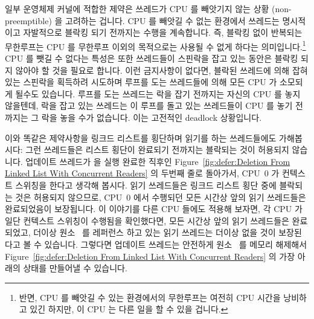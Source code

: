일부 운영체제 커널에 적합한 제약은 쓰레드가 CPU 를 빼앗기지 않는 상황
(non-preemptible) 을 고려하는 겁니다.
CPU 를 빼앗길 수 없는 환경에서 쓰레드는 명시적이고 자발적으로 블락킹 되기
전까지는 수행을 계속합니다.
즉, 블락킹 없이 반복되는 무한루프는 CPU 를 무한루프 이외의 목적으로는 사용될 수
없게 하다는 의미입니다.\footnote{
	반면, CPU 를 빼앗길 수 있는 환경에서의 무한루프는 여전히 CPU 시간을
	낭비하고 있긴 하지만, 이 CPU 는 다른 일을 할 수 있을 겁니다.}
CPU 를 뺏길 수 없다는 특성은 또한 쓰레드들이 스핀락을 잡고 있는 동안은 블락킹
되지 않아야 할 것을 필요로 합니다.
이런 금지사항이 없다면, 블락된 쓰레드에 의해 잡혀 있는 스핀락을 획득하려
시도하며 루프를 도는 쓰레드들에 의해 모든 CPU 가 소모되게 될수도 있습니다.
루프를 도는 쓰레드는 락을 잡기 전까지는 자신의 CPU 를 놓지 않을텐데, 락을 잡고
있는 쓰레드는 이 루프를 돌고 있는 쓰레드들이 CPU 를 놓기 전까지는 그 락을 놓을
수가 없습니다.
이는 고전적인 deadlock 상황입니다.

이와 똑같은 제약사항을 링크드 리스트를 횡단하며 읽기를 하는 쓰레드들에도
가해봅시다: 그런 쓰레드들은 리스트 횡단이 완료되기 전까지는 블락되는 것이
허용되지 않습니다.
업데이트 쓰레드가  을 실행 완료한 직후인
Figure~\ref{fig:defer:Deletion From Linked List With Concurrent Readers} 의
두번째 줄로 돌아가서, CPU~0 가 컨텍스트 스위칭을 한다고 생각해 봅시다.
읽기 쓰레드들은 링크드 리스트 횡단 중에 블락되는 것은 허용되지 않으므로, CPU~0
에서 수행되던 모든 시간상 앞의 읽기 쓰레드들은 완료되었음이 보장됩니다.
이 이야기를 다른 CPU 들에도 적용해 보자면, 각 CPU 가 일단 컨텍스트 스위칭이
수행됨을 확인했다면, 모든 시간상 앞의 읽기 쓰레드들은 완료되었고, 더이상
원소~ 를 레퍼런스 하고 있는 읽기 쓰레드는 더이상 없을 것이 보장된다고 볼
수 있습니다.
그렇다면 업데이트 쓰레드는 안전하게 원소~ 를 메모리 해제해서
Figure~\ref{fig:defer:Deletion From Linked List With Concurrent Readers} 의
가장 아래의 상태를 만들어낼 수 있습니다.
\iffalse

